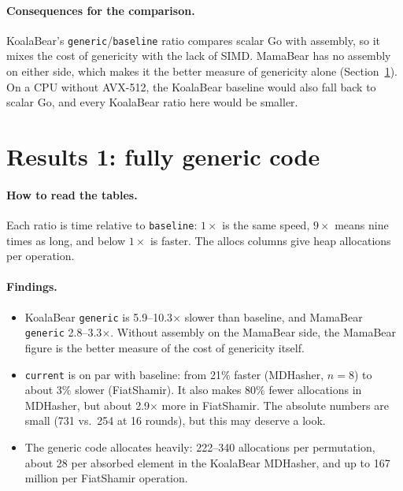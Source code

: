 \documentclass[10pt,a4paper]{article}
\begin{document}
\paragraph{Consequences for the comparison.} KoalaBear's \texttt{generic}/\texttt{baseline}
ratio compares scalar Go with assembly, so it mixes the cost of genericity with the lack of
SIMD. MamaBear has no assembly on either side, which makes it the better measure of
genericity alone (Section~\ref{sec:generic}). On a CPU without AVX-512, the KoalaBear
baseline would also fall back to scalar Go, and every KoalaBear ratio here would be smaller.

\section{Results 1: fully generic code}\label{sec:generic}





\paragraph{How to read the tables.} Each ratio is time relative to \texttt{baseline}:
$1\times$ is the same speed, $9\times$ means nine times as long, and below $1\times$ is
faster. The allocs columns give heap allocations per operation.

\paragraph{Findings.}
\begin{itemize}
  \item KoalaBear \texttt{generic} is 5.9--10.3$\times$ slower than baseline, and MamaBear
    \texttt{generic} 2.8--3.3$\times$. Without assembly on the MamaBear side, the MamaBear
    figure is the better measure of the cost of genericity itself.
  \item \texttt{current} is on par with baseline: from 21\% faster (MDHasher, $n=8$) to
    about 3\% slower (FiatShamir). It also makes 80\% fewer allocations in MDHasher, but
    about 2.9$\times$ more in FiatShamir. The absolute numbers are small (731 vs.\ 254 at
    16 rounds), but this may deserve a look.
  \item The generic code allocates heavily: 222--340 allocations per permutation, about 28
    per absorbed element in the KoalaBear MDHasher, and up to 167 million per FiatShamir
    operation.
\end{itemize}
\end{document}

